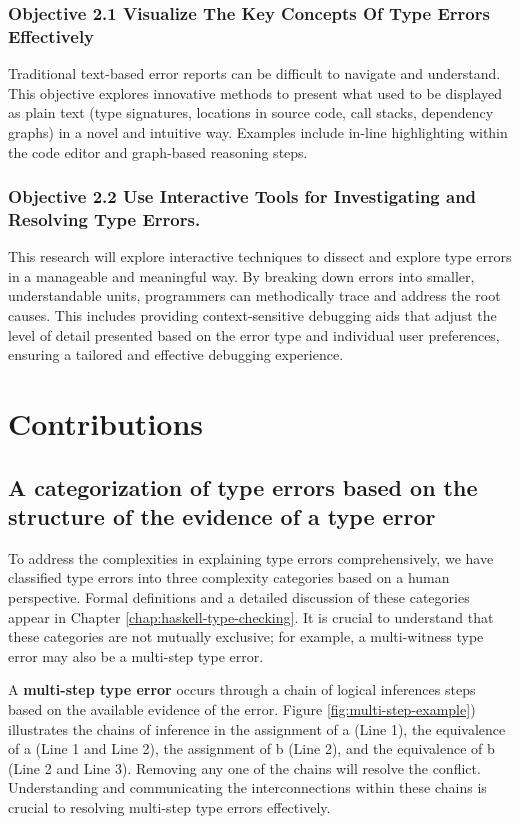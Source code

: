 \subsubsection{Objective 2.1 Visualize The Key Concepts Of Type Errors Effectively}

Traditional text-based error reports can be difficult to navigate and understand. This objective explores innovative methods to present what used to be displayed as plain text (type signatures, locations in source code, call stacks, dependency graphs) in a novel and intuitive way. Examples include in-line highlighting within the code editor and graph-based reasoning steps.  

\subsubsection{Objective 2.2 Use Interactive Tools for Investigating and Resolving Type Errors.}

This research will explore interactive techniques to dissect and explore type errors in a manageable and meaningful way. By breaking down errors into smaller, understandable units, programmers can methodically trace and address the root causes. This includes providing context-sensitive debugging aids that adjust the level of detail presented based on the error type and individual user preferences, ensuring a tailored and effective debugging experience.


\section{Contributions}

\subsection{A categorization of type errors based on the structure of the evidence of a type error}

To address the complexities in explaining type errors comprehensively, we have classified type errors into three complexity categories based on a human perspective. Formal definitions and a detailed discussion of these categories appear in Chapter \ref{chap:haskell-type-checking}. It is crucial to understand that these categories are not mutually exclusive; for example, a multi-witness type error may also be a multi-step type error.

A \textbf{multi-step type error} occurs through a chain of logical inferences steps based on the available evidence of the error. Figure \ref{fig:multi-step-example}) illustrates the chains of inference in the assignment of a (Line 1), the equivalence of a (Line 1 and Line 2), the assignment of b (Line 2), and the equivalence of b (Line 2 and Line 3). Removing any one of the chains will resolve the conflict. Understanding and communicating the interconnections within these chains is crucial to resolving multi-step type errors effectively.

